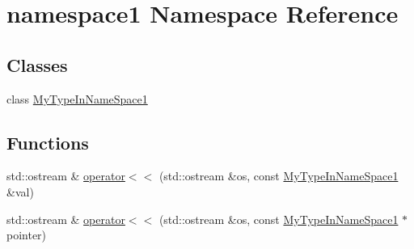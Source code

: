 \hypertarget{namespacenamespace1}{\section{namespace1 Namespace Reference}
\label{namespacenamespace1}
}
\subsection*{Classes}
\begin{DoxyCompactItemize}
\item 
class \hyperlink{classnamespace1_1_1_my_type_in_name_space1}{My\-Type\-In\-Name\-Space1}
\end{DoxyCompactItemize}
\subsection*{Functions}
\begin{DoxyCompactItemize}
\item 
std\-::ostream \& \hyperlink{namespacenamespace1_acfbce4e68e4055891e9ca30f7d4cbf82}{operator$<$$<$} (std\-::ostream \&os, const \hyperlink{classnamespace1_1_1_my_type_in_name_space1}{My\-Type\-In\-Name\-Space1} \&val)
\item 
std\-::ostream \& \hyperlink{namespacenamespace1_ac377ddc8113167c034b1e3d7a7c6262d}{operator$<$$<$} (std\-::ostream \&os, const \hyperlink{classnamespace1_1_1_my_type_in_name_space1}{My\-Type\-In\-Name\-Space1} $\ast$pointer)
\end{DoxyCompactItemize}


